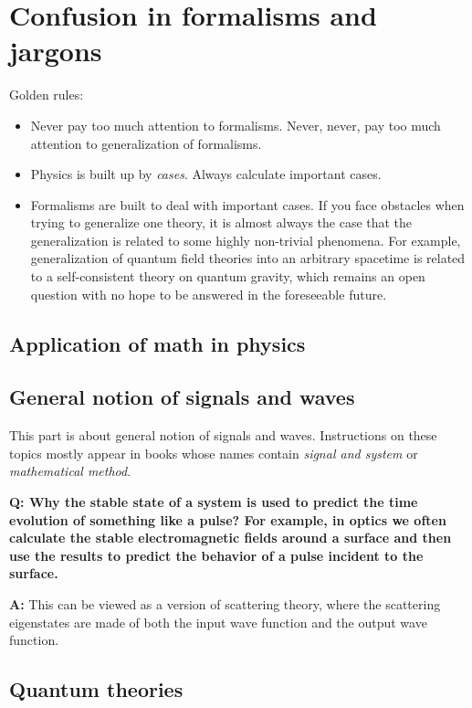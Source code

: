 \documentclass[hyperref, a4paper]{article}
\newenvironment{qanda}{\setlength{\parindent}{0pt}}{\bigskip}
\newcommand{\Q}{\bigskip\bfseries Q: }
\newcommand{\A}{\par\textbf{A:} \normalfont}
\begin{document}
\section{Confusion in formalisms and jargons}

Golden rules:
\begin{itemize}
    \item Never pay too much attention to formalisms. Never, never, pay too much attention to generalization of formalisms.
    \item Physics is built up by \emph{cases}. Always calculate important cases.
    \item Formalisms are built to deal with important cases. If you face obstacles when trying to generalize one theory, it is almost always the case that the generalization is related to some highly non-trivial phenomena.
    For example, generalization of quantum field theories into an arbitrary spacetime is related to a self-consistent theory on quantum gravity, which remains an open question with no hope to be answered in the foreseeable future.
\end{itemize}

\subsection{Application of math in physics}

\subsection{General notion of signals and waves}

This part is about general notion of signals and waves. Instructions on these topics mostly appear in books whose names contain \emph{signal and system} or \emph{mathematical method}.

\begin{qanda}

\Q Why the stable state of a system is used to predict the time evolution of something like a pulse? 
For example, in optics we often calculate the stable electromagnetic fields around a surface and then use the results to predict
the behavior of a pulse incident to the surface.
\A This can be viewed as a version of scattering theory, where the scattering eigenstates are made of both the
input wave function and the output wave function.

\end{qanda}

\subsection{Quantum theories}
\end{document}
